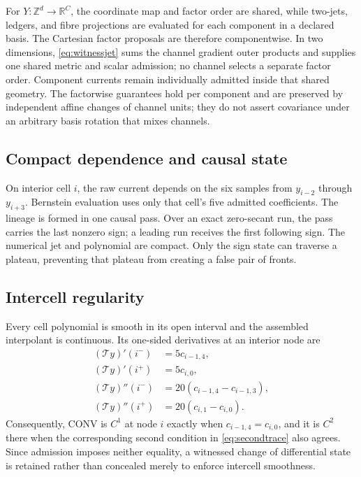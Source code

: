 \documentclass[journal]{IEEEtran}
\newcommand{\R}{\mathbb{R}}
\newcommand{\Tcal}{\mathcal{T}}
\begin{document}
For \(Y:\mathbb Z^d\rightarrow\R^C\), the coordinate map and factor order are
shared, while two-jets, ledgers, and fibre projections are evaluated for each
component in a declared basis. The Cartesian factor proposals are therefore
componentwise. In two dimensions, \eqref{eq:witnessjet} sums the channel
gradient outer products and supplies one shared metric and scalar admission;
no channel selects a separate factor order. Component currents remain
individually admitted inside that shared geometry. The factorwise guarantees
hold per component and are preserved by independent affine changes of channel
units; they do not assert covariance under an arbitrary basis rotation that
mixes channels.

\subsection{Compact dependence and causal state}

On interior cell \(i\), the raw current depends on the six samples from
\(y_{i-2}\) through \(y_{i+3}\). Bernstein evaluation uses only that cell's
five admitted coefficients. The lineage is formed in one causal pass. Over
an exact zero-secant run, the pass carries the last nonzero sign; a leading
run receives the first following sign. The numerical jet and polynomial are
compact. Only the sign state can traverse a plateau, preventing that plateau
from creating a false pair of fronts.

\subsection{Intercell regularity}

Every cell polynomial is smooth in its open interval and the assembled
interpolant is continuous. Its one-sided derivatives at an interior node are
\begin{align}
 (\Tcal y)'(i^-)&=5c_{i-1,4},\nonumber\\
 (\Tcal y)'(i^+)&=5c_{i,0},\label{eq:firsttrace}\\
 (\Tcal y)''(i^-)&=20(c_{i-1,4}-c_{i-1,3}),\nonumber\\
 (\Tcal y)''(i^+)&=20(c_{i,1}-c_{i,0}).
 \label{eq:secondtrace}
\end{align}
Consequently, CONV is \(C^1\) at node \(i\) exactly when
\(c_{i-1,4}=c_{i,0}\), and it is \(C^2\) there when the corresponding
second condition in \eqref{eq:secondtrace} also agrees. Since admission
imposes neither equality, a witnessed change of differential state is
retained rather than concealed merely to enforce intercell smoothness.
\end{document}
